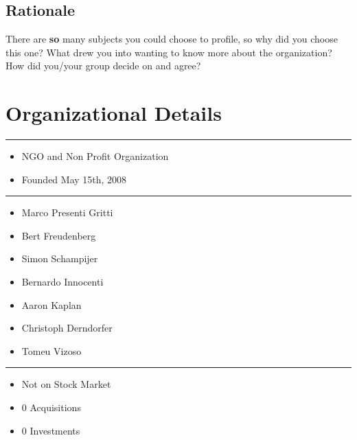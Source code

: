 \subsection{Rationale}\label{rationale}

There are \textbf{so} many subjects you could choose to profile, so why
did you choose this one? What drew you into wanting to know more about
the organization? How did you/your group decide on and agree?

\section{Organizational Details}\label{organizational-details}

\begin{center}\rule{3in}{0.4pt}\end{center}

\begin{itemize}
\itemsep1pt\parskip0pt
\item
  NGO and Non Profit Organization
\item
  Founded May 15th, 2008
\end{itemize}

\begin{center}\rule{3in}{0.4pt}\end{center}

\begin{itemize}
\itemsep1pt\parskip0pt
\item
  Marco Presenti Gritti
\item
  Bert Freudenberg
\item
  Simon Schampijer
\item
  Bernardo Innocenti
\item
  Aaron Kaplan
\item
  Christoph Derndorfer
\item
  Tomeu Vizoso
\end{itemize}

\begin{center}\rule{3in}{0.4pt}\end{center}

\begin{itemize}
\itemsep1pt\parskip0pt
\item
  Not on Stock Market
\item
  0 Acquisitions
\item
  0 Investments
\end{itemize}

